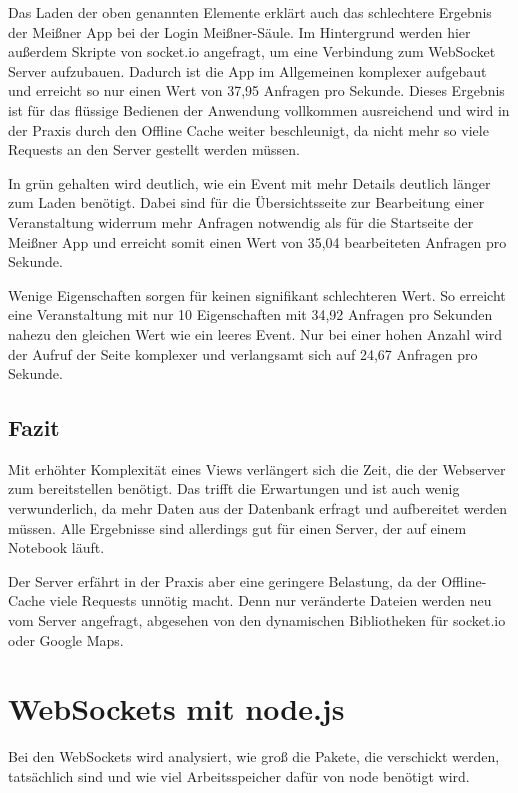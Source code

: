 Das Laden der oben genannten Elemente erklärt auch das schlechtere Ergebnis der Meißner App bei der \glqq Login Meißner\grqq{}-Säule. Im Hintergrund werden hier außerdem Skripte von socket.io angefragt, um eine Verbindung zum WebSocket Server aufzubauen. Dadurch ist die App im Allgemeinen komplexer aufgebaut und erreicht so nur einen Wert von 37,95 Anfragen pro Sekunde. Dieses Ergebnis ist für das flüssige Bedienen der Anwendung vollkommen ausreichend und wird in der Praxis durch den Offline Cache weiter beschleunigt, da nicht mehr so viele Requests an den Server gestellt werden müssen.\par

In grün gehalten wird deutlich, wie ein Event mit mehr Details deutlich länger zum Laden benötigt. Dabei sind für die Übersichtsseite zur Bearbeitung einer Veranstaltung widerrum mehr Anfragen notwendig als für die Startseite der Meißner App und erreicht somit einen Wert von 35,04 bearbeiteten Anfragen pro Sekunde.

\newpage
Wenige Eigenschaften sorgen für keinen signifikant schlechteren Wert. So erreicht eine Veranstaltung mit nur 10 Eigenschaften mit 34,92 Anfragen pro Sekunden nahezu den gleichen Wert wie ein leeres Event. Nur bei einer hohen Anzahl wird der Aufruf der Seite komplexer und verlangsamt sich auf 24,67 Anfragen pro Sekunde.

\subsection{Fazit}
Mit erhöhter Komplexität eines Views verlängert sich die Zeit, die der Webserver zum bereitstellen benötigt. Das trifft die Erwartungen und ist auch wenig verwunderlich, da mehr Daten aus der Datenbank erfragt und aufbereitet werden müssen. Alle Ergebnisse sind allerdings gut für einen Server, der auf einem Notebook läuft.\par

Der Server erfährt in der Praxis aber eine geringere Belastung, da der Offline-Cache viele Requests unnötig macht. Denn nur veränderte Dateien werden neu vom Server angefragt, abgesehen von den dynamischen Bibliotheken für socket.io oder Google Maps.


\section{WebSockets mit node.js}
Bei den WebSockets wird analysiert, wie groß die Pakete, die verschickt werden, tatsächlich sind und wie viel Arbeitsspeicher dafür von node benötigt wird.

